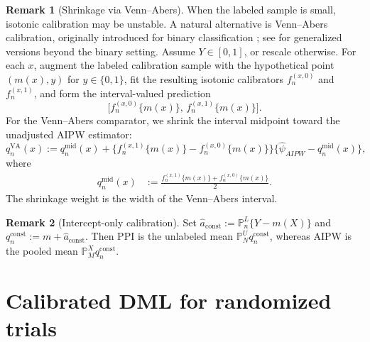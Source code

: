\documentclass{article}
\theoremstyle{plain}
\theoremstyle{definition}
\newtheorem{remark}{Remark}
\newcommand{\1}{\mathbf{1}}
\newcommand{\mhat}{m}
\newcommand{\Pl}{\mathbb{P}^{L}_n}
\newcommand{\Pu}{\mathbb{P}^{U}_N}
\newcommand{\Pmx}{\mathbb{P}^{X}_M}
\begin{document}
\begin{remark}[Shrinkage via Venn--Abers]
When the labeled sample is small, isotonic calibration may be unstable. A natural alternative is Venn--Abers calibration, originally introduced for binary classification \citep{vovk2012venn}; see \cite{van2024self, van2025venn} for generalized versions beyond the binary setting. Assume \(Y \in [0,1]\), or rescale otherwise. For each \(x\), augment the labeled calibration sample with the hypothetical point \((\mhat(x),y)\) for \(y \in \{0,1\}\), fit the resulting isotonic calibrators \(f_n^{(x,0)}\) and \(f_n^{(x,1)}\), and form the interval-valued prediction
\[
\bigl[f_n^{(x,0)}\{\mhat(x)\},\, f_n^{(x,1)}\{\mhat(x)\}\bigr].
\]
For the Venn--Abers comparator, we shrink the interval midpoint toward the unadjusted AIPW estimator:
\[
q_n^{\mathrm{VA}}(x)
:=
q_n^{\mathrm{mid}}(x)
+
\bigl\{f_n^{(x,1)}\{\mhat(x)\}-f_n^{(x,0)}\{\mhat(x)\}\bigr\}
\bigl\{\widehat\psi_{AIPW}-q_n^{\mathrm{mid}}(x)\bigr\},
\]
where
\[
\begin{aligned}
q_n^{\mathrm{mid}}(x)
&:=
\frac{f_n^{(x,1)}\{\mhat(x)\}+f_n^{(x,0)}\{\mhat(x)\}}{2}.
\end{aligned}
\]
The shrinkage weight is the width of the Venn--Abers interval.
\end{remark}

\begin{remark}[Intercept-only calibration]
Set \(\hat a_{\mathrm{const}}:=\Pl\{Y-\mhat(X)\}\) and
\(q_n^{\mathrm{const}}:=\mhat+\hat a_{\mathrm{const}}\).
Then PPI is the unlabeled mean \(\Pu q_n^{\mathrm{const}}\), whereas
AIPW is the pooled mean \(\Pmx q_n^{\mathrm{const}}\).
\end{remark}

\section{Calibrated DML for randomized trials}
\label{app:causal}
\end{document}
